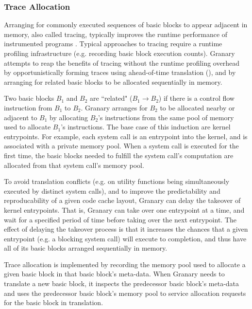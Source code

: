 \documentclass[preprint]{sigplanconf}
\begin{document}
\subsubsection{Trace Allocation}\label{sec:trace_alloc}
Arranging for commonly executed sequences of basic blocks to appear adjacent in memory, also called tracing, typically improves the runtime performance of instrumented programs \cite{DynamoRIO}. Typical approaches to tracing require a runtime profiling infrastructure (e.g. recording basic block execution counts). Granary attempts to reap the benefits of tracing without the runtime profiling overhead by opportunistically forming traces using ahead-of-time translation (), and by arranging for related basic blocks to be allocated sequentially in memory.

Two basic blocks $B_1$ and $B_2$ are ``related" ($B_1 \to B_2$) if there is a control flow instruction from $B_1$ to $B_2$. Granary arranges for $B_2$ to be allocated nearby or adjacent to $B_1$ by allocating $B_2$'s instructions from the same pool of memory used to allocate $B_1$'s instructions. The base case of this induction are kernel entrypoints. For example, each system call is an entrypoint into the kernel, and is associated with a private memory pool. When a system call is executed for the first time, the basic blocks needed to fulfill the system call's computation are allocated from that system call's memory pool.

To avoid translation conflicts (e.g. on utility functions being simultaneously executed by distinct system calls), and to improve the predictability and reproducability of a given code cache layout, Granary can delay the takeover of kernel entrypoints. That is, Granary can take over one entrypoint at a time, and wait for a specified period of time before taking over the next entrypoint. The effect of delaying the takeover process is that it increases the chances that a given entrypoint (e.g. a blocking system call) will execute to completion, and thus have all of its basic blocks  arranged sequentially in memory.

Trace allocation is implemented by recording the memory pool used to allocate a given basic block in that basic block's meta-data. When Granary needs to translate a new basic block, it inspects the predecessor basic block's meta-data and uses the predecessor basic block's memory pool to service allocation requests for the basic block in translation.
\end{document}
